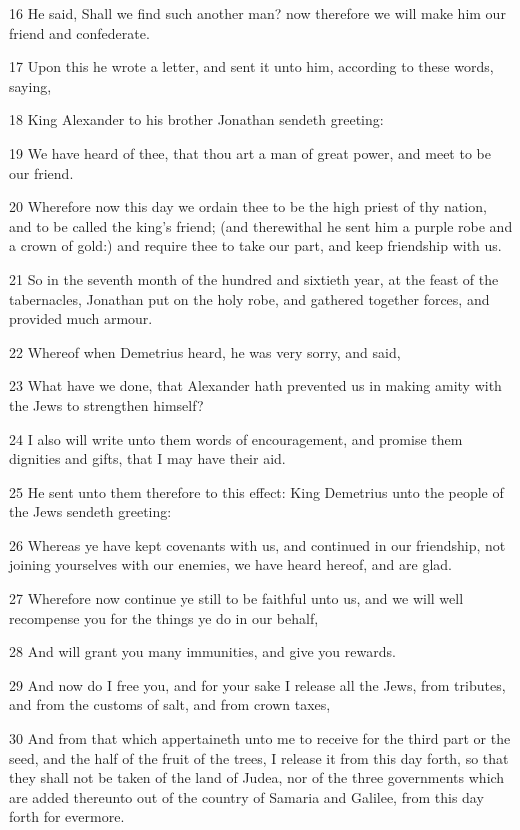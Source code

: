 \par 16 He said, Shall we find such another man? now therefore we will make him our friend and confederate.
\par 17 Upon this he wrote a letter, and sent it unto him, according to these words, saying,
\par 18 King Alexander to his brother Jonathan sendeth greeting:
\par 19 We have heard of thee, that thou art a man of great power, and meet to be our friend.
\par 20 Wherefore now this day we ordain thee to be the high priest of thy nation, and to be called the king's friend; (and therewithal he sent him a purple robe and a crown of gold:) and require thee to take our part, and keep friendship with us.
\par 21 So in the seventh month of the hundred and sixtieth year, at the feast of the tabernacles, Jonathan put on the holy robe, and gathered together forces, and provided much armour.
\par 22 Whereof when Demetrius heard, he was very sorry, and said,
\par 23 What have we done, that Alexander hath prevented us in making amity with the Jews to strengthen himself?
\par 24 I also will write unto them words of encouragement, and promise them dignities and gifts, that I may have their aid.
\par 25 He sent unto them therefore to this effect: King Demetrius unto the people of the Jews sendeth greeting:
\par 26 Whereas ye have kept covenants with us, and continued in our friendship, not joining yourselves with our enemies, we have heard hereof, and are glad.
\par 27 Wherefore now continue ye still to be faithful unto us, and we will well recompense you for the things ye do in our behalf,
\par 28 And will grant you many immunities, and give you rewards.
\par 29 And now do I free you, and for your sake I release all the Jews, from tributes, and from the customs of salt, and from crown taxes,
\par 30 And from that which appertaineth unto me to receive for the third part or the seed, and the half of the fruit of the trees, I release it from this day forth, so that they shall not be taken of the land of Judea, nor of the three governments which are added thereunto out of the country of Samaria and Galilee, from this day forth for evermore.
